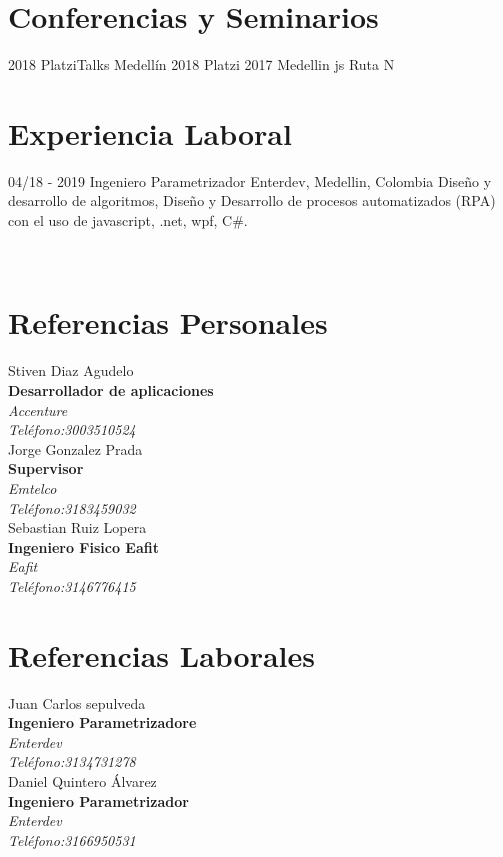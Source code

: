 \documentclass[]{friggeri-cv}
\begin{document}
\section{Conferencias y Seminarios}
\begin{entrylist}
  \entry
    {2018}
    {PlatziTalks Medellín 2018}
    {Platzi}
    {\emph{ }}
     \entry
    {2017}
    {Medellin js}
    {Ruta N}
    {\emph{}}
\end{entrylist}
\newpage
\section{Experiencia Laboral}

\begin{entrylist}
  \entry
    {04/18 - 2019 }
    {Ingeniero Parametrizador}
    {Enterdev, Medellin, Colombia}
    {Diseño y desarrollo de algoritmos, Diseño y Desarrollo de procesos automatizados (RPA) con el uso de javascript, .net, wpf, C\#. \\}

\end{entrylist}

\begin{aside}
~
~
~
    ~
\end{aside}


\section{Referencias Personales}
Stiven Diaz Agudelo\\
\textbf{Desarrollador de aplicaciones }\\
\emph{Accenture}\\
\emph{Teléfono:3003510524}
\\

Jorge  Gonzalez Prada                                              \\
\textbf{Supervisor  }\\
\emph{Emtelco}\\
\emph{Teléfono:3183459032}\\

Sebastian Ruiz Lopera         \\
\textbf{Ingeniero Fisico Eafit}\\
\emph{Eafit}\\
\emph{Teléfono:3146776415 }
\\
\section{Referencias Laborales}
Juan Carlos sepulveda\\
\textbf{Ingeniero Parametrizadore}\\
\emph{Enterdev}\\
\emph{Teléfono:3134731278}
\\

Daniel Quintero Álvarez                                              \\
\textbf{Ingeniero Parametrizador }\\
\emph{Enterdev}\\
\emph{Teléfono:3166950531}
\\



\begin{flushleft}
\emph{}
\end{flushleft}
\begin{flushright}
\emph{}
\end{flushright}
\end{document}
